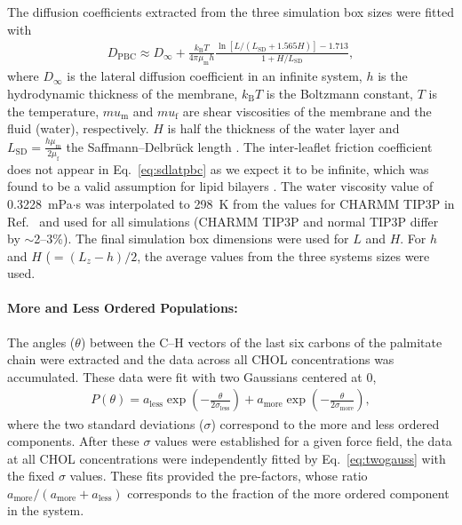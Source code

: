 \documentclass[journal=jctcce]{achemso}
\begin{document}
The diffusion coefficients extracted from the three simulation box sizes were fitted with
%
\begin{align}
	D_\mathrm{PBC}\approx D_\infty+\frac{k_\mathrm{B}T}{4\pi\mu_\mathrm{m}h}\frac{\ln\left[L/\left(L_\mathrm{SD}+1.565H\right)\right]-1.713}{1+H/L_\mathrm{SD}},
	\label{eq:sdlatpbc}
\end{align}
%
where $D_\infty$ is the lateral diffusion coefficient in an infinite system, $h$ is the hydrodynamic thickness of the membrane, $k_\mathrm{B}T$ is the Boltzmann constant, $T$ is the temperature, $mu_\mathrm{m}$ and $mu_\mathrm{f}$ are shear viscosities of the membrane and the fluid (water), respectively. $H$ is half the thickness of the water layer and $L_\mathrm{SD}=\frac{h\mu_\mathrm{m}}{2\mu_\mathrm{f}}$ the Saffmann--Delbr\"{u}ck length \cite{vogele2018hydrodynamics}. The inter-leaflet friction coefficient does not appear in Eq.~\eqref{eq:sdlatpbc} as we expect it to be infinite, which was found to be a valid assumption for lipid bilayers \cite{vogele2018hydrodynamics}. The water viscosity value of 0.3228~mPa$\cdot$s was interpolated to 298~K from the values for CHARMM TIP3P in Ref.~ and used for all simulations (CHARMM TIP3P and normal TIP3P differ by $\sim$2--3\%). The final simulation box dimensions were used for $L$ and $H$. For $h$ and $H$ ($=(L_z-h)/2$, the average values from the three systems sizes were used. 

\paragraph{More and Less Ordered Populations:} The angles ($\theta$) between the C--H vectors of the last six carbons of the palmitate chain were extracted and the data across all CHOL concentrations was accumulated. These data were fit with two Gaussians centered at 0,
%
\begin{align}
    P(\theta)=a_\mathrm{less}\exp\left(-\frac{\theta}{2\sigma_\mathrm{less}}\right)+a_\mathrm{more}\exp\left(-\frac{\theta}{2\sigma_\mathrm{more}}\right),
    \label{eq:twogauss}
\end{align}
%
where the two standard deviations ($\sigma$) correspond to the more and less ordered components. After these $\sigma$ values were established for a given force field, the data at all CHOL concentrations were independently fitted by Eq.~\eqref{eq:twogauss} with the fixed $\sigma$ values. These fits provided the pre-factors, whose ratio $a_\mathrm{more}/(a_\mathrm{more}+a_\mathrm{less})$ corresponds to the fraction of the more ordered component in the system. 
\end{document}
